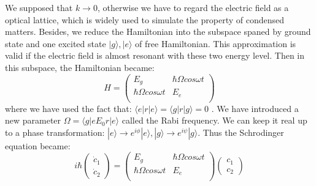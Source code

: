 \documentclass[11pt]{article}
\begin{document}
We supposed that $k \to 0$, otherwise we have to regard the electric field as a  optical lattice, which is widely used to simulate the property of condensed matters. Besides, we reduce the Hamiltonian into the subspace spaned by ground state and one excited state $|g\rangle, |e \rangle$ of free Hamiltonian. This approximation is valid if the electric field is almost resonant with these two energy level.  Then in this subspace, the Hamiltonian became:
$$
H = \begin{pmatrix}
    E_g & \hbar \Omega cos\omega t \\
    \hbar \Omega cos\omega t & E_e \\
\end{pmatrix}
$$
where we have used the fact that: $\langle e | r | e \rangle = \langle g | r | g \rangle = 0$ . We have introduced a new parameter $\Omega = \langle g | e E_0 r | e \rangle$ called the Rabi frequency. We can keep it real up to a phase transformation: $|e\rangle \to e^{i\phi} |e\rangle, |g\rangle \to e^{i\psi} |g\rangle $. Thus the Schrodinger equation became:
$$
i\hbar \begin{pmatrix}
    \Dot{c}_1 \\
    \Dot{c}_2
\end{pmatrix}= \begin{pmatrix}
    E_g & \hbar \Omega cos\omega t \\
    \hbar \Omega cos\omega t & E_e \\
\end{pmatrix} \begin{pmatrix}
    {c}_1 \\
    {c}_2
\end{pmatrix}
$$
\end{document}
